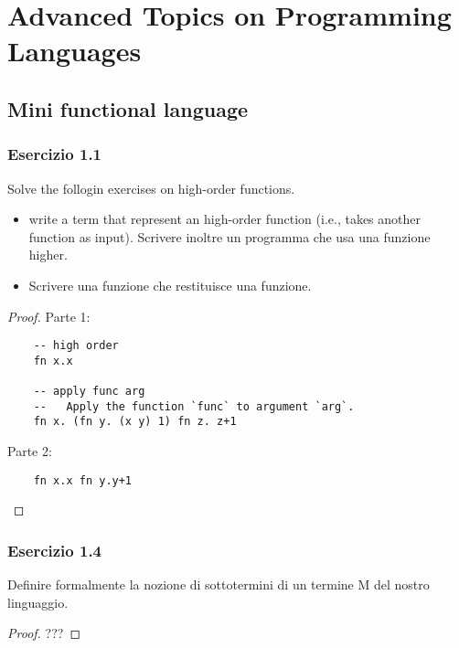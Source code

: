 \documentclass[12pt,a4paper,oneside]{book}
\begin{document}
\chapter{Advanced Topics on Programming Languages}

\section{Mini functional language}

\subsection{Esercizio 1.1}

\begin{exercise}
    Solve the follogin exercises on high-order functions. 
    \begin{itemize}
        \item write a term that represent an high-order function (i.e., takes another function as input). Scrivere inoltre un
        programma che usa una funzione higher.
        \item Scrivere una funzione che restituisce una funzione.
    \end{itemize}

\begin{proof}
    Parte 1:
    \begin{verbatim}
    -- high order
    fn x.x

    -- apply func arg
    --   Apply the function `func` to argument `arg`.
    fn x. (fn y. (x y) 1) fn z. z+1
    \end{verbatim}

    Parte 2:
    \begin{verbatim}
    fn x.x fn y.y+1
    \end{verbatim}

\end{proof}

\end{exercise}

\subsection{Esercizio 1.4}

\begin{exercise}
    Definire formalmente la nozione di sottotermini di un termine M del nostro linguaggio.
    \begin{proof}
        ??? 
    \end{proof}
\end{exercise}
\end{document}
